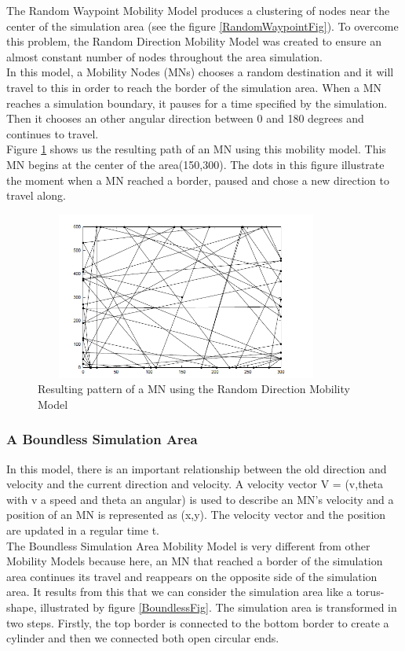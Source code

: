The Random Waypoint Mobility Model produces a clustering of nodes near the center of the simulation area (see the figure \ref{RandomWaypointFig}). To overcome this problem, the Random Direction Mobility Model was created to ensure an almost constant number of nodes throughout the area simulation.\\ 
In this model, a Mobility Nodes (MNs) chooses a random destination and it will travel to this in order to reach the border of the simulation area. When a MN reaches a simulation boundary, it pauses for a time specified by the simulation. Then it chooses an other angular direction between 0 and 180 degrees and continues to travel.\\ 
Figure \ref{RandomDirectionFig} shows us the resulting path of an MN using this mobility model. This MN begins at the center of the area(150,300). The dots in this figure illustrate the moment when a MN reached a border, paused and chose a new direction to travel along.\\

\begin{figure}[h]
\center
\includegraphics[width=10cm,height=55mm]{../images/randomdirection1.png}
\caption{\label{RandomDirectionFig}Resulting pattern of a MN using the Random Direction Mobility Model}
\end{figure}

\newpage

\subsubsection{A Boundless Simulation Area}

In this model, there is an important relationship between the old direction and velocity and the current direction and velocity. A velocity vector V = (v,theta with v a speed and theta an angular) is used to describe an MN's velocity and a position of an MN is represented as (x,y). The velocity vector and the position are updated in a regular time t.\\
The Boundless Simulation Area Mobility Model is very different from other Mobility Models because here, an MN that reached a border of the simulation area continues its travel and reappears on the opposite side of the simulation area. It results from this that we can consider the simulation area like a torus-shape, illustrated by figure \ref{BoundlessFig}. The simulation area is transformed in two steps. Firstly, the top border is connected to the bottom border to create a cylinder and then we connected both open circular ends.\\

